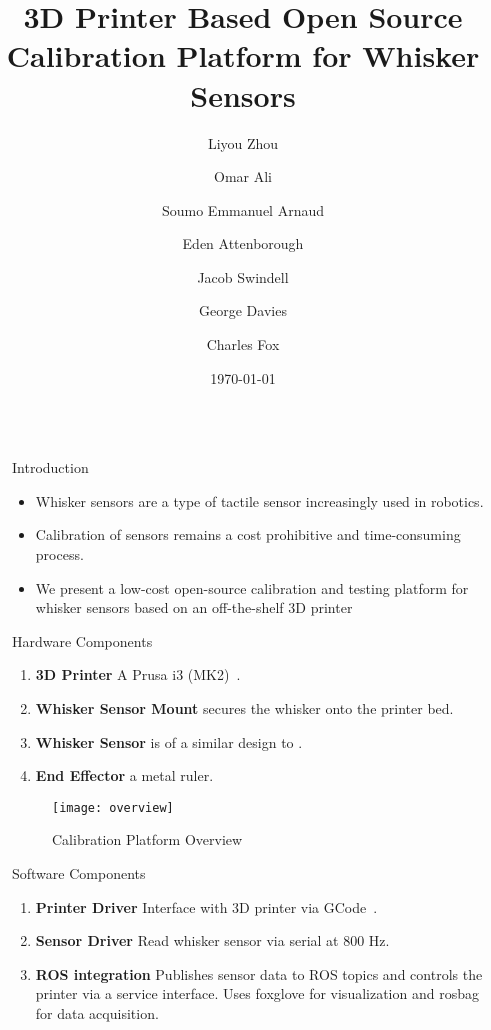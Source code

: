 \documentclass[final]{beamer}
\title{3D Printer Based Open Source Calibration Platform for Whisker Sensors}
\author{
    Liyou Zhou \and
    Omar Ali \and
    Soumo Emmanuel Arnaud \and\linebreak
    Eden Attenborough \and
    Jacob Swindell \and
    George Davies \and
    Charles Fox
}
\date{\today}
\institute[shortinst]{Department of Computer Science, University of Lincoln}
\newlength{\sepwidth}
\newlength{\colwidth}
\newcommand{\separatorcolumn}{\begin{column}{\sepwidth}\end{column}}
\begin{document}
\begin{frame}[t]
\begin{columns}[t]

\separatorcolumn

\begin{column}{\colwidth}
  \begin{block}{Introduction}
    \begin{itemize}
      \item Whisker sensors are a type of tactile sensor increasingly used in robotics. \cite{fotouhiDetectionBarelyVisible2021,struckmeierViTaSLAMBioinspiredVisuoTactile2019,foxTactileSLAMBiomimetic2012}
      \item Calibration of sensors remains a cost prohibitive and time-consuming process. \cite{sullivanTactileDiscriminationUsing2012,fotouhiDetectionBarelyVisible2021,evansWhiskerobjectContactSpeed2010}
      \item We present a low-cost open-source calibration and testing platform for whisker sensors based on an off-the-shelf 3D printer
    \end{itemize}
  \end{block}

  \begin{block}{Hardware Components}
    \begin{enumerate}
        \item \textbf{3D Printer} A Prusa i3 (MK2)~\cite{OriginalPrusaI3}.
        \item \textbf{Whisker Sensor Mount} secures the whisker onto the printer bed.
        \item \textbf{Whisker Sensor} is of a similar design to \cite{stevenson2024whisker}.
        \item \textbf{End Effector} a metal ruler.
    \end{enumerate}
  
    \begin{figure}
      \centering
      \texttt{[image: overview]}
      \caption{Calibration Platform Overview}
      \label{fig:overview}
    \end{figure}
  \end{block}

  \begin{block}{Software Components}
    \begin{enumerate}
      \item \textbf{Printer Driver} Interface with 3D printer via GCode~\cite{kramerNISTRS274NGCInterpreter2000}.
      \item \textbf{Sensor Driver} Read whisker sensor via serial at 800 Hz.
      \item \textbf{ROS integration} Publishes sensor data to ROS topics and controls the printer via a service interface. Uses foxglove for visualization and rosbag for data acquisition.
    \end{enumerate}


\end{block}
\end{column}
\end{columns}
\end{frame}
\end{document}
